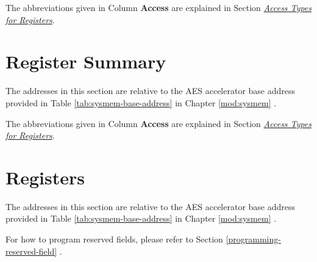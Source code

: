 \documentclass[main\_\_EN.tex]{subfiles}
\begin{document}
The abbreviations given in Column \textbf{Access} are explained in Section \hyperref[glossary-access-types]{\textit{Access Types for Registers}}.



\clearpage

\hypertarget{aes-reg-summ}{}
\section{Register Summary}

The addresses in this section are relative to the AES accelerator base address provided in Table \ref{tab:sysmem-base-address} in Chapter \ref{mod:sysmem} \textit{}.

The abbreviations given in Column \textbf{Access} are explained in Section \hyperref[glossary-access-types]{\textit{Access Types for Registers}}.



\clearpage
\section{Registers}
The addresses in this section are relative to the AES accelerator base address provided in Table \ref{tab:sysmem-base-address} in Chapter \ref{mod:sysmem} \textit{}.

For how to program reserved fields, please refer to Section \ref{programming-reserved-field} \textit{}.


\end{document}
